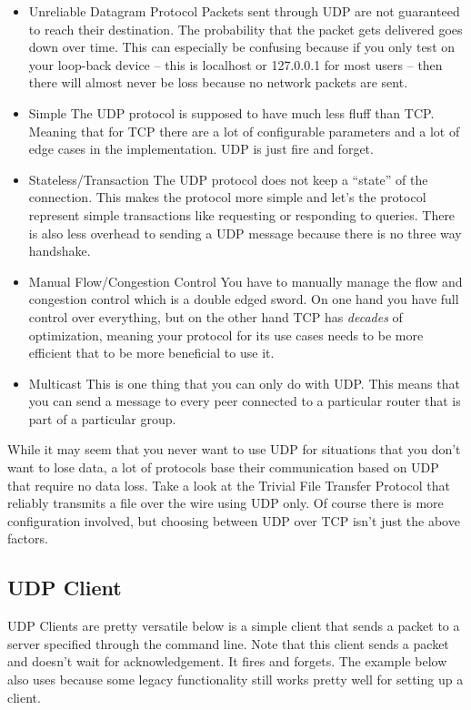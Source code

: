 \begin{itemize}
\item Unreliable Datagram Protocol
  Packets sent through UDP are not guaranteed to reach their destination.
  The probability that the packet gets delivered goes down over time.
  This can especially be confusing because if you only test on your loop-back device -- this is localhost or 127.0.0.1 for most users -- then there will almost never be loss because no network packets are sent.
\item Simple
  The UDP protocol is supposed to have much less fluff than TCP.
  Meaning that for TCP there are a lot of configurable parameters and a lot of edge cases in the implementation.
  UDP is just fire and forget.
\item Stateless/Transaction
  The UDP protocol does not keep a ``state'' of the connection.
  This makes the protocol more simple and let's the protocol represent simple transactions like requesting or responding to queries.
  There is also less overhead to sending a UDP message because there is no three way handshake.
\item Manual Flow/Congestion Control
  You have to manually manage the flow and congestion control which is a double edged sword.
  On one hand you have full control over everything, but on the other hand TCP has \textit{decades} of optimization, meaning your protocol for its use cases needs to be more efficient that to be more beneficial to use it.
\item Multicast
  This is one thing that you can only do with UDP.
  This means that you can send a message to every peer connected to a particular router that is part of a particular group.
\end{itemize}


While it may seem that you never want to use UDP for situations that you don't want to lose data, a lot of protocols base their communication based on UDP that require no data loss.
Take a look at the Trivial File Transfer Protocol that reliably transmits a file over the wire using UDP only.
Of course there is more configuration involved, but choosing between UDP over TCP isn't just the above factors.

\subsection{UDP Client}

UDP Clients are pretty versatile below is a simple client that sends a packet to a server specified through the command line.
Note that this client sends a packet and doesn't wait for acknowledgement.
It fires and forgets.
The example below also uses  because some legacy functionality still works pretty well for setting up a client.

